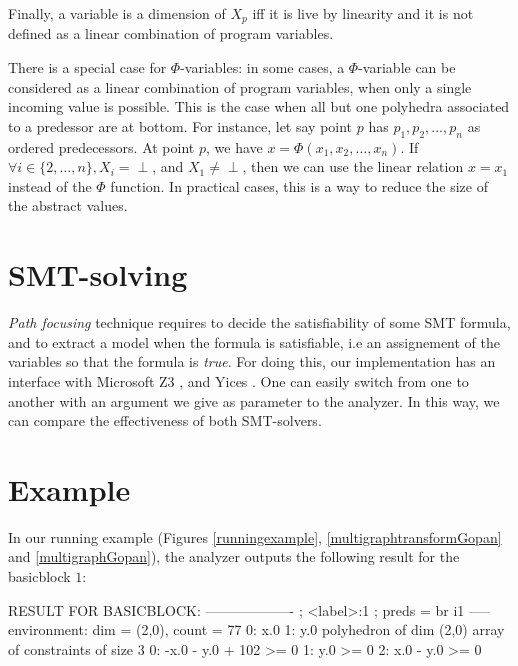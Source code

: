 \documentclass[a4paper,english,titlepage,11pt]{report}
\begin{document}
	Finally, a variable is a dimension of $X_p$ iff it is live by linearity and
	it is not defined as a linear combination of program variables.


	There is a special case for $\Phi$-variables: in some cases, a
	$\Phi$-variable can be considered as a linear combination of program
	variables, when only a single incoming value is possible. This is the case
	when all but one polyhedra associated to a predessor are at bottom.
	For instance, let say point $p$ has $p_1, p_2, \dots, p_n$ as ordered 
	predecessors. At point $p$, we have $x = \Phi(x_1, x_2,\dots,x_n)$.
	If $\forall i \in \{2,\dots,n\}, X_i = \perp$, and $X_1 \neq \perp$, then we
	can use the linear relation $x = x_1$ instead of the $\Phi$ function. In
	practical cases, this is a way to reduce the size of the abstract values.


	\section{SMT-solving}

	\emph{Path focusing} technique requires to decide the satisfiability of some
	SMT formula, and to extract a model when the formula is satisfiable, i.e an
	assignement of the variables so that the formula is \emph{true}. For doing
	this, our implementation has an interface with Microsoft Z3 \cite{MouraB08},
	and Yices \cite{DutertreM06}. One can easily switch from one to another with
	an argument we give as parameter to the analyzer. In this way, we can
	compare the effectiveness of both SMT-solvers.

	\section{Example}

	In our running example (Figures \ref{runningexample},
	\ref{multigraphtransformGopan} and \ref{multigraphGopan}), the analyzer
	outputs the following result for the basicblock $1$:

\begin{C}
RESULT FOR BASICBLOCK: -------------------
; <label>:1                                 ; preds = %
  br i1 %
-----
environment: dim = (2,0), count = 77
 0: x.0
 1: y.0
polyhedron of dim (2,0)
array of constraints of size 3
 0: -x.0 - y.0 + 102 >= 0
 1: y.0 >= 0
 2: x.0 - y.0 >= 0
\end{C}
\end{document}
